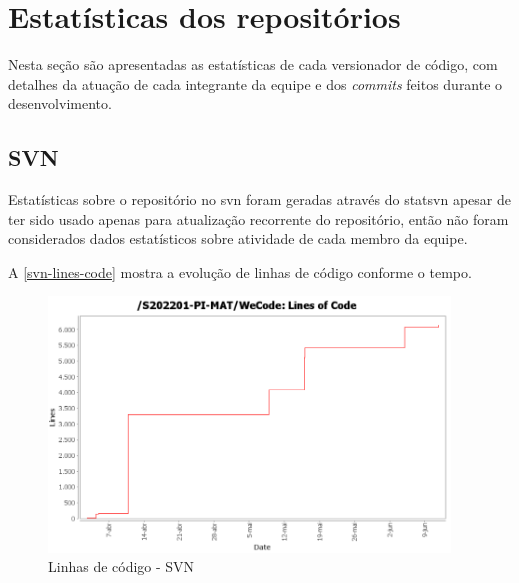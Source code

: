 \section{Estatísticas dos repositórios}
Nesta seção são apresentadas as estatísticas de cada versionador de código, com detalhes da atuação de cada integrante da equipe e dos \textit{commits} feitos durante o desenvolvimento.

\subsection{SVN}
Estatísticas sobre o repositório no \gls{svn} foram geradas através do \gls{statsvn} apesar de ter sido usado apenas para atualização recorrente do repositório, então não foram considerados dados estatísticos sobre atividade de cada membro da equipe.

A \autoref{svn-lines-code} mostra a evolução de linhas de código conforme o tempo.
\begin{figure}[H]
	\centering
	\caption{\label{svn-lines-code}Linhas de código - SVN}
	\includegraphics[width=0.95\textwidth]{../imagens/stats/svn-lines-code.png}
\end{figure}

